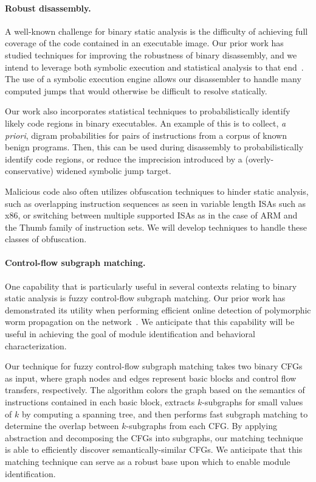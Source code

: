 \documentclass[letterpaper,twoside,11pt,headings=small]{scrartcl}
\begin{document}
\paragraph{Robust disassembly.} A well-known challenge for binary static
analysis is the difficulty of achieving full coverage of the code contained in
an executable image. Our prior work has studied techniques for improving the
robustness of binary disassembly, and we intend to leverage both symbolic
execution and statistical analysis to that end~\cite{kruegel:sec2004:disasm}.
The use of a symbolic execution engine allows our disassembler to handle many
computed jumps that would otherwise be difficult to resolve statically.

Our work also incorporates statistical techniques to probabilistically
identify likely code regions in binary executables.  An example of this is to
collect, \emph{a priori}, digram probabilities for pairs of instructions from
a corpus of known benign programs.  Then, this can be used during disassembly
to probabilistically identify code regions, or reduce the imprecision
introduced by a (overly-conservative) widened symbolic jump target.

Malicious code also often utilizes obfuscation techniques to hinder static
analysis, such as overlapping instruction sequences as seen in variable length
ISAs such as x86, or switching between multiple supported ISAs as in the case
of ARM and the Thumb family of instruction sets.  We will develop techniques
to handle these classes of obfuscation.

\paragraph{Control-flow subgraph matching.} One capability that is
particularly useful in several contexts relating to binary static analysis is
fuzzy control-flow subgraph matching.  Our prior work has demonstrated its
utility when performing efficient online detection of polymorphic worm
propagation on the network~\cite{kruegel:raid2005:worm}. We anticipate that
this capability will be useful in achieving the goal of module identification
and behavioral characterization.

Our technique for fuzzy control-flow subgraph matching takes two binary CFGs
as input, where graph nodes and edges represent basic blocks and control flow
transfers, respectively.  The algorithm colors the graph based on the
semantics of instructions contained in each basic block, extracts
$k$-subgraphs for small values of $k$ by computing a spanning tree, and then
performs fast subgraph matching to determine the overlap between $k$-subgraphs
from each CFG. By applying abstraction and decomposing the CFGs into
subgraphs, our matching technique is able to efficiently discover
semantically-similar CFGs.  We anticipate that this matching technique can
serve as a robust base upon which to enable module identification.
\end{document}

